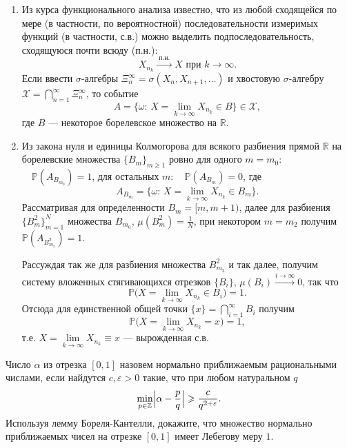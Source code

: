 \begin{solution}
\begin{enumerate}
\item
Из курса функционального анализа известно, что из любой сходящейся по мере (в частности, по вероятностной) последовательности 
измеримых функций (в частности, с.в.) можно выделить подпоследовательность, сходящуюся почти всюду (п.н.): 
$$
X_{n_k}\xrightarrow{\text{ п.н. }}X \text{ при } k\to\infty . 
$$
Если ввести $\sigma$-алгебры $\Xi_n^{\infty}=\sigma(X_n, X_{n+1},\ldots)$ и хвостовую $\sigma$-алгебру 
${\mathcal X}=\bigcap\limits_{n=1}^{\infty}\Xi_{n}^{\infty}$, то событие 
$$
A=\{ \omega: \, X=\lim\limits_{k\to\infty} X_{n_k}\in B \} \in {\mathcal X} , 
$$
где $B$ --- некоторое борелевское множество на ${\mathbb R}$. 

\item
Из закона нуля и единицы Колмогорова для всякого разбиения прямой ${\mathbb R}$ на борелевские множества $\{ B_m\}_{m\geqslant 1}$ 
ровно для одного $m=m_0:$ $\quad {\mathbb P}(A_{B_{m_0}})=1$, для остальных $m:\quad {\mathbb P}(A_{B_m})=0$, где 
$$
A_{B_m}=\{ \omega: \, X=\lim\limits_{k\to\infty} X_{n_k}\in B_m \} . 
$$
Рассматривая для определенности $B_m=[m,m+1)$, далее для разбиения $\{ B^2_m\}_{m=1}^N$ множества $B_{m_0}$, 
$\mu(B^2_m)=\frac{1}{N}$, при некотором $m=m_2$ получим ${\mathbb P}(A_{B^2_{m_2}})=1$. 

Рассуждая так же для разбиения множества $B^2_{m_2}$ и так далее, получим систему вложенных стягивающихся отрезков $\{ B_i\}$, 
$\mu(B_i)\xrightarrow{i\to\infty}0$, так что 
$$
{\mathbb P}\bigl(X=\lim\limits_{k\to\infty} X_{n_k}\in B_i \bigr)=1 . 
$$
Отсюда для единственной общей точки $\{ x\}=\bigcap\limits_{i=1}^{\infty}B_i$ получим 
$$
{\mathbb P}\bigl(X=\lim\limits_{k\to\infty} X_{n_k}=x \bigr)=1 , 
$$
т.е. $X=\lim\limits_{k\to\infty} X_{n_k}\equiv x$ --- вырожденная с.в. 

\end{enumerate}
\end{solution}


\begin{problem}
Число $\alpha$ из отрезка $[0, 1]$ назовем нормально приближаемым рациональными числами, если найдутся $c,\varepsilon>0$ такие, что 
при любом натуральном $q$ 
\begin{equation}
\label{BorelKantel}
\min\limits_{p\in {\mathbb Z}} \Bigl|\alpha-\frac{p}{q} \Bigr|\geqslant \frac{c}{q^{2+\varepsilon}} . 
\end{equation}
Используя лемму Бореля-Кантелли, докажите, что множество нормально приближаемых чисел на отрезке $[0, 1]$ имеет Лебегову меру $1$. 

\end{problem}

